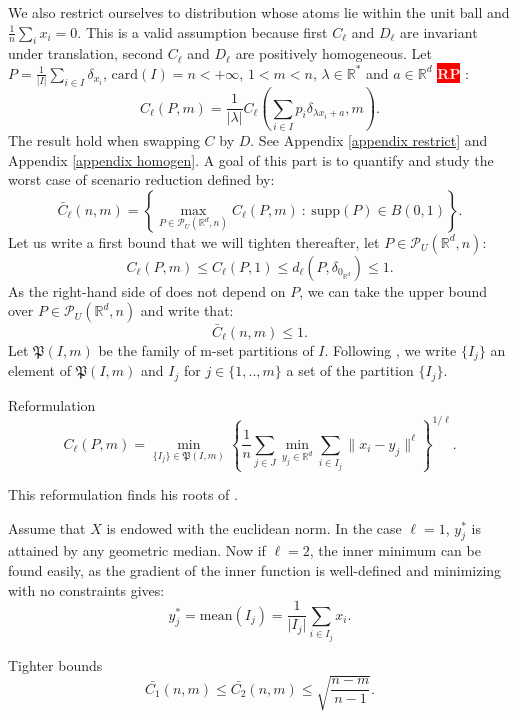 \documentclass{amsart}
\newcommand{\nb}[3]{
		{\colorbox{#2}{\bfseries\sffamily\tiny\textcolor{white}{#1}}}
		{\textcolor{#2}{\text{$\blacktriangleright$}{\textcolor{#2}{#3}}\text{$\blacktriangleleft$}}}}
\newcommand{\rp}[1]{\nb{RP}{red}{#1}}
\newcommand{\RR}{\mathbb{R}}
\begin{document}
We also restrict ourselves to distribution whose atoms lie within the unit ball and $\frac{1}{n}\sum_ix_i=0$. This is a valid assumption because first $C_\ell$ and $D_\ell$ are invariant under translation, second $C_\ell$ and $D_\ell$ are positively homogeneous. Let $P=\frac{1}{\lvert I\rvert}\sum_{i\in I}\delta_{x_i}$, $\text{card}\left(I\right)=n<+\infty$, $1<m<n$, $\lambda\in\RR^*$ and $a\in\RR^d$ \rp{faire une appendice}:
$$ 
C_\ell\left(P,m\right)=\frac{1}{\lvert\lambda\rvert} C_\ell\left(\sum_{i\in I}p_i\delta_{\lambda x_i+a},m\right).
$$
The result hold when swapping $C$ by $D$. See Appendix \ref{appendix restrict} and Appendix \ref{appendix homogen}. A goal of this part is to quantify and study the worst case of scenario reduction defined by:
$$    \bar{C}_\ell\left(n,m \right)=\left\{\max_{P\in\mathcal{P}_U(\mathbb{R}^d,n)}C_\ell(P,m)\: :\: \text{supp}(P)\in B(0,1)\right\}.
$$
Let us write a first bound that we will tighten thereafter, let $P\in\mathcal{P}_U(\mathbb{R}^d,n)$:
\begin{equation}\label{easy bound}C_\ell\left(P,m\right)\leq C_\ell\left(P,1\right)\leq d_\ell\left(P,\delta_{0_{\RR^d}}\right)\leq 1.\end{equation}
As the right-hand side of  does not depend on $P$, we can take the upper bound over $P\in\mathcal{P}_U\left(\RR^d,n\right)$ and write that:
$$
\bar{C}_\ell\left(n,m \right)\leq1.
$$
Let $\mathfrak{P}(I,m)$ be the family of m-set partitions of $I$. Following \cite{rujeerapaiboon_scenario_2022}, we write $\{I_j\}$ an element of $\mathfrak{P}(I,m)$ and $I_j$ for $j\in\{1,..,m\}$ a set of the partition $\{I_j\}$.
\begin{theorem}{Reformulation}\label{theorem1}
$$C_\ell(P,m)=\min_{\{I_j\}\in \mathfrak{P}(I,m)}\left\{ \frac{1}{n}\sum_{j\in J}\min_{y_j\in\mathbb{R}^d}\sum_{i\in I_j}\lVert x_i-y_j\rVert^\ell \right\}^{1/\ell}.$$
\end{theorem}
\begin{remark}
    This reformulation finds his roots of .
\end{remark}
Assume that $X$ is endowed with the euclidean norm. In the case $\ell=1$, $y_j^*$ is attained by any geometric median. Now if $\ell=2$, the inner minimum can be found easily, as the gradient of the inner function is well-defined and minimizing with  no constraints gives: $$y_j^*=\text{mean}\left(I_j\right)=\frac{1}{\lvert I_j\rvert}{\sum_{i\in I_j}x_i}.$$ 
\begin{proposition}{Tighter bounds}
$$\bar{C_1}\left(n,m\right)\leq\bar{C_2}\left(n,m\right)\leq\sqrt{\frac{n-m}{n-1}}.$$
\end{proposition}
\end{document}
